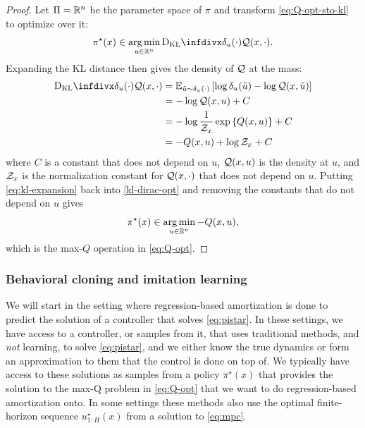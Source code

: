 \documentclass[twoside,11pt]{article}
\begin{document}
\begin{proof}
  Let $\Pi=\mathbb{R}^n$ be the parameter space of $\pi$ and transform
  \cref{eq:Q-opt-sto-kl} to optimize over it:
  \begin{equation}
  \pi^\star(x) \in \argmin_{u\in\R^n} \kl{\delta_u(\cdot)}{\gQ(x, \cdot)}.
  \label{kl-dirac-opt}
  \end{equation}
  Expanding the KL distance then gives the density of ${\mathcal{Q}}$ at the mass:
  \begin{equation}
    \begin{aligned}
      \kl{\delta_u(\cdot)}{\gQ(x, \cdot)}
      & = \E_{\tilde u\sim \delta_u(\cdot)} \left[ \log{\delta_u(\tilde u)} - \log \gQ(x,\tilde u)\right] \\
      & = -\log \gQ(x,u)+C \\
      & = -\log \frac{1}{\gZ_x}\exp\left\{Q(x,u)\right\} + C\\
      & = -Q(x, u) + \log \gZ_x + C \\
    \end{aligned}
    \label{eq:kl-expansion}
  \end{equation}
  where $C$ is a constant that does not depend on $u$,
  ${\mathcal{Q}}(x,u)$ is the density at $u$, and
  ${\mathcal{Z}}_x$ is the normalization constant for ${\mathcal{Q}}(x,\cdot)$
  that does not depend on $u$.
  Putting \cref{eq:kl-expansion} back into
  \cref{kl-dirac-opt} and removing the constants that
  do not depend on $u$ gives
  \begin{equation}
  \pi^\star(x)\in \operatorname*{arg\,min}_{u\in\mathbb{R}^n} -Q(x,u),
  \end{equation}
  which is the max-$Q$ operation in \cref{eq:Q-opt}.
\end{proof}

\subsubsection{Behavioral cloning and imitation learning}
We will start in the setting where regression-based amortization
is done to predict the solution of a controller that
solves \cref{eq:pistar}.
In these settings, we have access to a controller, or samples from it,
that uses traditional methods, and \emph{not} learning,
to solve \cref{eq:pistar}, and we either know
the true dynamics or form an approximation to them
that the control is done on top of.
We typically have access to these solutions as samples
from a policy $\pi^\star(x)$ that provides the solution
to the max-Q problem in \cref{eq:Q-opt} that we want to
do regression-based amortization onto.
In some settings these methods also use the
optimal finite-horizon sequence $u^\star_{1:H}(x)$
from a solution to \cref{eq:mpc}.
\end{document}
